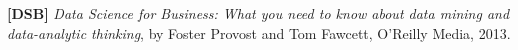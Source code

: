 \newpage

\textbf{[DSB]} \emph{Data Science for Business: What you need to know about data mining and data-analytic thinking}, by Foster Provost and Tom Fawcett, O'Reilly Media, 2013. 







